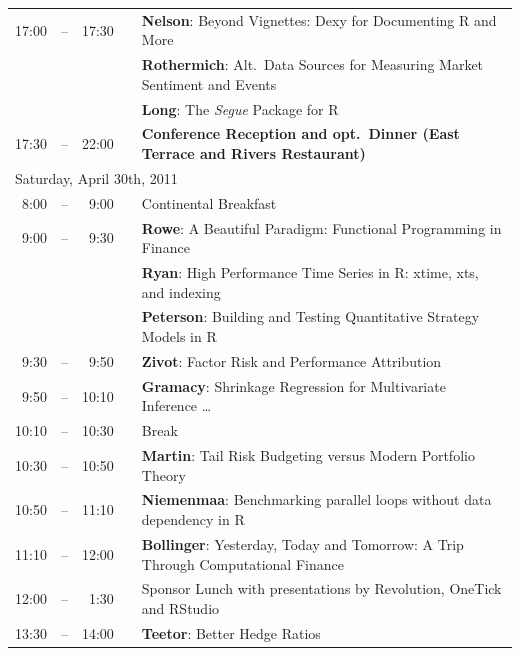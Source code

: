 \documentclass[letterpaper,10pt]{article}
\newcommand{\mylinecolor}[1]{\color{#1}\vspace{-8pt}}  %
\begin{document}
\begin{tabular}{rlrlp{5in}}
17:00&\color{Breaks}-- & 17:30&   &\textbf{\color{LightningTalk} Nelson}: \small{Beyond Vignettes: Dexy for Documenting R and More} \\
     & &      &   &\textbf{\color{LightningTalk} Rothermich}: \small{Alt.~Data Sources for Measuring Market Sentiment and Events} \\
     & &      &   &\textbf{\color{LightningTalk} Long}: \small{The \emph{Segue} Package for R} \\
17:30&\color{Breaks}-- & 22:00&   &\textbf{\color{Breaks} Conference Reception and opt.~Dinner (East Terrace and Rivers Restaurant)} \\[12pt]
\multicolumn{5}{l}{\large \color{Breaks}Saturday, April 30th, 2011} \\[10pt]
 8:00&\color{Breaks}-- &  9:00&   &\small{\mylinecolor{Breaks} Continental Breakfast} \\
 9:00&\color{Breaks}-- &  9:30&   &\textbf{\color{LightningTalk} Rowe}: \small{A Beautiful Paradigm: Functional Programming in Finance} \\
     & &      &   &\textbf{\color{LightningTalk} Ryan}: \small{High Performance Time Series in R: xtime, xts, and indexing} \\
     & &      &   &\textbf{\color{LightningTalk} Peterson}: \small{Building and Testing Quantitative Strategy Models in R} \\
 9:30&\color{Breaks}-- &  9:50&   &\textbf{\color{Talk} Zivot}: \small{Factor Risk and Performance Attribution} \\
 9:50&\color{Breaks}-- & 10:10&   &\textbf{\color{Talk} Gramacy}: \small{Shrinkage Regression for Multivariate Inference \ldots} \\
10:10&\color{Breaks}-- & 10:30&   &\small{\mylinecolor{Breaks} Break} \\
10:30&\color{Breaks}-- & 10:50&   &\textbf{\color{Talk} Martin}: \small{Tail Risk Budgeting versus Modern Portfolio Theory} \\
10:50&\color{Breaks}-- & 11:10&   &\textbf{\color{Talk} Niemenmaa}: \small{Benchmarking parallel loops without data dependency in R} \\
11:10&\color{Breaks}-- & 12:00&   &\textbf{\color{KeynoteTalk} Bollinger}: \small{Yesterday, Today and Tomorrow: A Trip Through Computational Finance} \\
12:00&\color{Breaks}-- &  1:30&   &\small{\mylinecolor{Breaks} Sponsor Lunch with presentations by Revolution, OneTick and RStudio} \\
13:30&\color{Breaks}-- & 14:00&   &\textbf{\color{LightningTalk} Teetor}: \small{Better Hedge Ratios} \\

\end{tabular}
\end{document}
